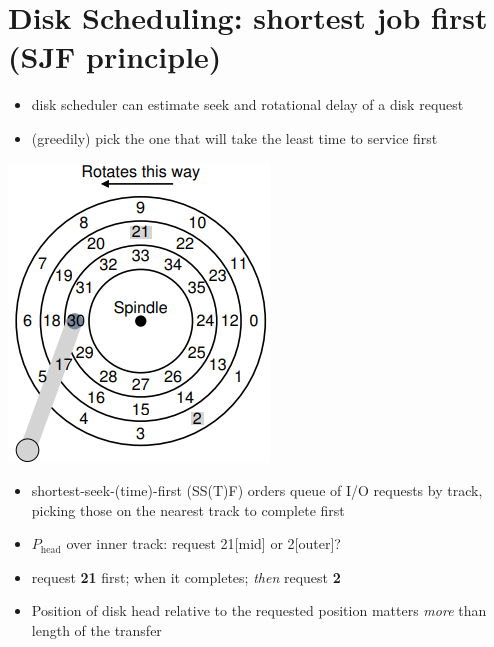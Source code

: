 \section*{Disk Scheduling: shortest job first (SJF principle)}
\begin{itemize}
\item disk scheduler can estimate seek and rotational delay of a disk request
\item (greedily) pick the one that will take the least time to service first
\end{itemize}
\begin{minipage}{.25\linewidth}
  \includegraphics[width=\linewidth]{imgs/disk_sstf}
\end{minipage}
\begin{minipage}{.75\linewidth}
  \flushleft
  \begin{itemize}
  \item shortest-seek-(time)-first (SS(T)F) orders queue of I/O requests by track, picking those on the nearest track to complete first
  \item $P_{\text{head}}$ over inner track: request 21[mid] or 2[outer]?
  \item request \textbf{21} first; when it completes; \emph{then} request \textbf{2}
  \item Position of disk head relative to the requested position matters \emph{more}
than length of the transfer
  \end{itemize}
\end{minipage}
